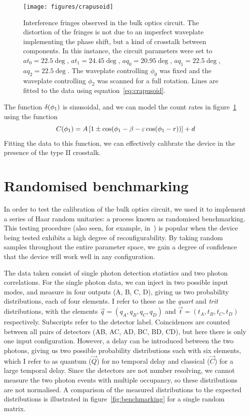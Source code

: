 \begin{figure}[h]
  \centering
  \texttt{[image: figures/crapusoid]}
  \caption[Interference fringes distorted by crosstalk between components]
  {Interference fringes observed in the bulk optics circuit. The distortion of
  the fringes is not due to an imperfect waveplate implementing the phase shift,
  but a kind of crosstalk between components. In this instance, the circuit
  parameters were set to \(at_{0}=22.5\deg\), \(at_{1}=24.45\deg\),
  \(aq_{0}=20.95\deg\), \(aq_{1}=22.5\deg\), \(aq_{2}=22.5\deg\). The waveplate
  controlling \(\phi_{0}\) was fixed and the waveplate controlling \(\phi_{2}\)
  was scanned for a full rotation. Lines are fitted to the data using
  equation~\ref{eq:crapusoid}.}
  \label{fig:crapusoid}
\end{figure}

The function \(\delta \!\left(\phi_{1}\right)\) is sinusoidal, and we can model the
count rates in figure~\ref{fig:crapusoid} using the function
\begin{equation}
  \label{eq:crapusoid}
  C \!\left(\phi_{1}\right) = A \left[ 1 \pm \cos \!\left( \phi_{1} - \beta - \varepsilon
  \cos \!\left( \phi_{1} - r\right)\right) \right] + d
\end{equation}
Fitting the data to this function, we can effectively calibrate the device in
the presence of the type II crosstalk. 

\section{Randomised benchmarking}
\label{sec:Benchmarking}
In order to test the calibration of the bulk optics circuit, we used it to
implement a series of Haar random unitaries: a process known as randomised
benchmarking. This testing procedure (also seen, for example,
in~\cite{peteschip}) is popular when the device being tested exhibits a high
degree of reconfigurability. By taking random samples throughout the entire
parameter space, we gain a degree of confidence that the device will work well
in any configuration.

The data taken consist of single photon detection statistics and two photon
correlations. For the single photon data, we can inject in two possible input
modes, and measure in four outputs (A, B, C, D), giving us two probability
distributions, each of four elements. I refer to these as the \emph{quart}
and \emph{trit} distributions, with the elements \(\vec{q}= \left( q_{A}, q_{B},
q_{C}, q_{D} \right)\) and \(\vec{t} = \left( t_{A}, t_{B}, t_{C}, t_{D}
\right)\) respectively. Subscripts refer to the detector label. Coincidences are
counted between all pairs of detectors (AB, AC, AD, BC, BD, CD), but here there
is only one input configuration. However, a delay can be introduced between
the two photons, giving us two possible probability distributions each with six
elements, which I refer to as quantum (\(\vec{Q}\)) for no temporal delay and
classical (\(\vec{C}\)) for a large temporal delay. Since the detectors are not
number resolving, we cannot measure the two photon events with multiple
occupancy, so these distributions are not normalised. A comparison of the
measured distributions to the expected distributions is illustrated in
figure~\ref{fig:benchmarking} for a single random matrix.

